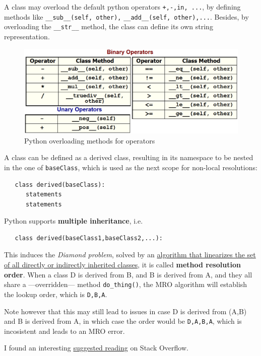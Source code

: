 \begin{paracol}{2}
   A class may overload the default python operators \lstinline|+,-,in, ...|,
   by defining methods like \lstinline|__sub__(self, other),| \lstinline|__add__(self, other),...|.
   Besides, by overloading the \lstinline|__str__| method, the class can define its own string representation.
   \switchcolumn
   \begin{figure}[htbp]
      \centering
      \includegraphics[width=0.9\columnwidth]{images/python_overloading.png}
      \caption{Python overloading methods for operators}
      \label{fig:python_overloading}
   \end{figure}
\end{paracol}


A class can be defined as a derived class, resulting in its namespace to be nested in the one of \lstinline|baseClass|, which is used as the next scope for non-local resolutions:  
\begin{lstlisting}
   class derived(baseClass):
      statements
      statements
\end{lstlisting}
Python supports \textbf{multiple inheritance}, i.e.
\begin{lstlisting}
   class derived(baseClass1,baseClass2,...):
\end{lstlisting}
This induces the \textit{Diamond problem}, solved by an \href{https://www.python.org/download/releases/2.3/mro/}{algorithm that linearizes the set of all directly or indirectly inherited classes}, it is called \textbf{method resolution order}.
When a class D is derived from B, and B is derived from A, and they all share a ---overridden--- method \lstinline|do_thing()|, the MRO algorithm will establish the lookup order, which is \lstinline|D,B,A|.

Note however that this may still lead to issues in case D is derived from (A,B) and B is derived from A, in which case the order would be \lstinline|D,A,B,A|, which is incosistent and leads to an MRO error.

I found an interesting \href{https://stackoverflow.com/questions/56361048/what-is-the-diamond-problem-in-python-and-why-its-not-appear-in-python2}{suggested reading}
on Stack Overflow.



